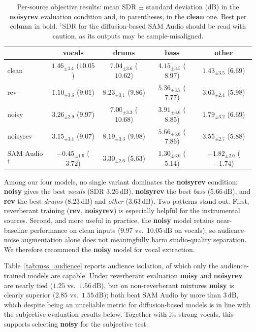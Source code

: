 \begin{table}[htbp]
\centering\footnotesize
\setlength{\tabcolsep}{4pt}\renewcommand{\arraystretch}{1.3}
\caption{Per-source objective results: mean \acrshort{SDR} $\pm$ standard
deviation (dB) in the \textbf{noisyrev} evaluation condition and, in
parentheses, in the \textbf{clean} one. Best per column in bold.
$^\dagger$\acrshort{SDR} for the diffusion-based SAM Audio should be read with
caution, as its outputs may be sample-misaligned.}
\label{tab:mss_persource}
\begin{tabular}{@{}lcccc@{}}
\toprule
 & vocals & drums & bass & other \\
\midrule
clean       & $1.46_{\pm 3.4}$ ($\mathbf{10.05}$) & $7.04_{\pm 3.6}$ ($10.62$) & $4.15_{\pm 3.5}$ ($\mathbf{8.97}$) & $1.43_{\pm 3.5}$ ($\mathbf{6.69}$) \\
rev         & $1.10_{\pm 3.6}$ ($9.01$) & $\mathbf{8.23}_{\pm 3.1}$ ($9.86$) & $5.36_{\pm 3.7}$ ($7.77$) & $\mathbf{3.63}_{\pm 2.4}$ ($5.98$) \\
noisy       & $\mathbf{3.26}_{\pm 2.9}$ ($9.97$) & $7.00_{\pm 3.3}$ ($\mathbf{10.68}$) & $3.91_{\pm 3.6}$ ($8.85$) & $1.79_{\pm 3.2}$ ($\mathbf{6.69}$) \\
noisyrev    & $3.15_{\pm 3.1}$ ($9.07$) & $8.19_{\pm 3.3}$ ($9.98$) & $\mathbf{5.66}_{\pm 3.6}$ ($7.86$) & $3.55_{\pm 2.7}$ ($5.88$) \\
SAM Audio$^\dagger$ & $-0.45_{\pm 1.9}$ ($3.72$) & $3.30_{\pm 2.6}$ ($5.63$) & $1.30_{\pm 3.0}$ ($5.14$) & $-1.82_{\pm 2.0}$ ($-1.74$) \\
\bottomrule
\end{tabular}
\end{table}


Among our four models, no single variant dominates the \textbf{noisyrev}
condition: \textbf{noisy} gives the best \emph{vocals} (\acrshort{SDR}
$3.26\,\text{dB}$), \textbf{noisyrev} the best \emph{bass} ($5.66\,\text{dB}$),
and \textbf{rev} the best \emph{drums} ($8.23\,\text{dB}$) and \emph{other}
($3.63\,\text{dB}$). Two patterns stand out. First, reverberant training
(\textbf{rev}, \textbf{noisyrev}) is especially helpful for the instrumental
sources. Second, and more useful in practice, the \textbf{noisy} model retains
near-baseline performance on clean inputs ($9.97$ vs.\ $10.05\,\text{dB}$ on
vocals), so audience-noise augmentation alone does not meaningfully harm
studio-quality separation. We therefore recommend the \textbf{noisy} model for
vocal extraction.

Table~\ref{tab:mss_audience} reports audience isolation, of which only the
audience-trained models are capable. Under reverberant evaluation \textbf{noisy}
and \textbf{noisyrev} are nearly tied ($1.25$ vs.\ $1.56\,\text{dB}$), but on
non-reverberant mixtures \textbf{noisy} is clearly superior ($2.85$ vs.\
$1.55\,\text{dB}$); both beat SAM Audio by more than $3\,\text{dB}$, which despite 
being an unreliable metric for diffusion-based models is 
in line with the subjective evaluation results below. Together
with its strong vocals, this supports selecting \textbf{noisy} for the
subjective test.

